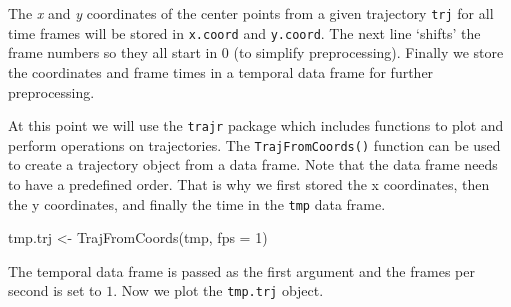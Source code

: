 \documentclass[
  11pt,
]{krantz}
\newenvironment{Shaded}{\begin{snugshade}}{\end{snugshade}}
\newcommand{\AttributeTok}[1]{\textcolor[rgb]{0.61,0.61,0.61}{#1}}
\newcommand{\CommentTok}[1]{\textcolor[rgb]{0.37,0.37,0.37}{\textit{#1}}}
\newcommand{\DecValTok}[1]{\textcolor[rgb]{0.06,0.06,0.06}{#1}}
\newcommand{\FunctionTok}[1]{\textcolor[rgb]{0,0,0}{#1}}
\newcommand{\NormalTok}[1]{#1}
\newcommand{\OtherTok}[1]{\textcolor[rgb]{0.37,0.37,0.37}{#1}}
\newcommand{\SpecialCharTok}[1]{\textcolor[rgb]{0,0,0}{#1}}
\begin{document}
\begin{Shaded}
\end{Shaded}

The \emph{x} and \emph{y} coordinates of the center points from a given trajectory \texttt{trj} for all time frames will be stored in \texttt{x.coord} and \texttt{y.coord}. The next line `shifts' the frame numbers so they all start in \(0\) (to simplify preprocessing). Finally we store the coordinates and frame times in a temporal data frame for further preprocessing.

At this point we will use the \texttt{trajr} package \citep{trajr} which includes functions to plot and perform operations on trajectories. The \texttt{TrajFromCoords()} function can be used to create a trajectory object from a data frame. Note that the data frame needs to have a predefined order. That is why we first stored the x coordinates, then the y coordinates, and finally the time in the \texttt{tmp} data frame.

\begin{Shaded}
\begin{Highlighting}[]
\NormalTok{tmp.trj }\OtherTok{\textless{}{-}} \FunctionTok{TrajFromCoords}\NormalTok{(tmp, }\AttributeTok{fps =} \DecValTok{1}\NormalTok{)}
\end{Highlighting}
\end{Shaded}

The temporal data frame is passed as the first argument and the frames per second is set to \(1\). Now we plot the \texttt{tmp.trj} object.
\end{document}

